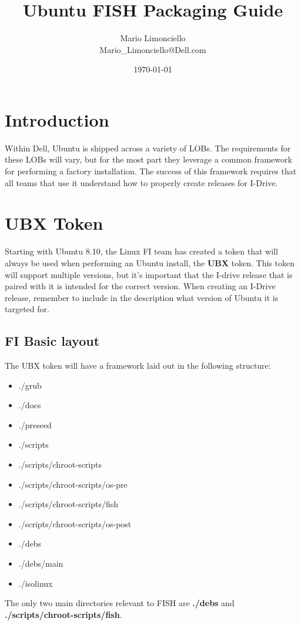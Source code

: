 \documentclass[letterpaper,10pt,titlepage]{article}
\title{\textbf{Ubuntu FISH Packaging Guide}}
\author{Mario Limonciello\\ Mario\_Limonciello@Dell.com}
\date{\today}
\begin{document}
\maketitle

\tableofcontents
\newpage

\section{Introduction}
Within Dell, Ubuntu is shipped across a variety of LOBs.  The requirements for these LOBs will vary, but for the most part they leverage a common framework for performing a factory installation.  The success of this framework requires that all teams that use it understand how to properly create releases for I-Drive.

\section{UBX Token}
Starting with Ubuntu 8.10, the Linux FI team has created a token that will always be used when performing an Ubuntu install, the \textbf{UBX} token.  This token will support multiple versions, but it's important that the I-drive release that is paired with it is intended for the correct version.  When creating an I-Drive release, remember to include in the description what version of Ubuntu it is targeted for.

\subsection{FI Basic layout}
The UBX token will have a framework laid out in the following structure:
\begin{itemize}
\item ./grub
\item ./docs
\item ./preseed
\item ./scripts
\item ./scripts/chroot-scripts
\item ./scripts/chroot-scripts/os-pre
\item ./scripts/chroot-scripts/fish
\item ./scripts/chroot-scripts/os-post
\item ./debs
\item ./debs/main
\item ./isolinux
\end{itemize}

The only two main directories relevant to FISH are \textbf{./debs} and \textbf{./scripts/chroot-scripts/fish}.
\end{document}
